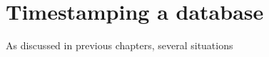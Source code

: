 \section{Timestamping a database}
\label{timestamping-db}

As discussed in previous chapters, several situations 